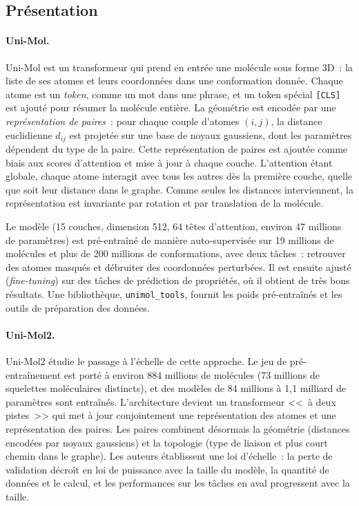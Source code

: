 \subsection{Présentation}

\paragraph{Uni-Mol.}
Uni-Mol \cite{Zhou-2023} est un transformeur qui prend en entrée une molécule sous forme 3D~: la liste de ses atomes et leurs coordonnées dans une conformation donnée.
Chaque atome est un \emph{token}, comme un mot dans une phrase, et un token spécial \texttt{[CLS]} est ajouté pour résumer la molécule entière.
La géométrie est encodée par une \emph{représentation de paires}~: pour chaque couple d'atomes $(i, j)$, la distance euclidienne $d_{ij}$ est projetée sur une base de noyaux gaussiens, dont les paramètres dépendent du type de la paire.
Cette représentation de paires est ajoutée comme biais aux scores d'attention et mise à jour à chaque couche.
L'attention étant globale, chaque atome interagit avec tous les autres dès la première couche, quelle que soit leur distance dans le graphe.
Comme seules les distances interviennent, la représentation est invariante par rotation et par translation de la molécule.

Le modèle (15 couches, dimension 512, 64 têtes d'attention, environ 47 millions de paramètres) est pré-entraîné de manière auto-supervisée sur 19 millions de molécules et plus de 200 millions de conformations, avec deux tâches~: retrouver des atomes masqués et débruiter des coordonnées perturbées.
Il est ensuite ajusté (\emph{fine-tuning}) sur des tâches de prédiction de propriétés, où il obtient de très bons résultats.
Une bibliothèque, \texttt{unimol\_tools}, fournit les poids pré-entraînés et les outils de préparation des données.

\paragraph{Uni-Mol2.}
Uni-Mol2 \cite{Ji-2024} étudie le passage à l'échelle de cette approche.
Le jeu de pré-entraînement est porté à environ 884 millions de molécules (73 millions de squelettes moléculaires distincts), et des modèles de 84 millions à 1,1 milliard de paramètres sont entraînés.
L'architecture devient un transformeur <<~à deux pistes~>> qui met à jour conjointement une représentation des atomes et une représentation des paires.
Les paires combinent désormais la géométrie (distances encodées par noyaux gaussiens) et la topologie (type de liaison et plus court chemin dans le graphe).
Les auteurs établissent une loi d'échelle~: la perte de validation décroît en loi de puissance avec la taille du modèle, la quantité de données et le calcul, et les performances sur les tâches en aval progressent avec la taille.


